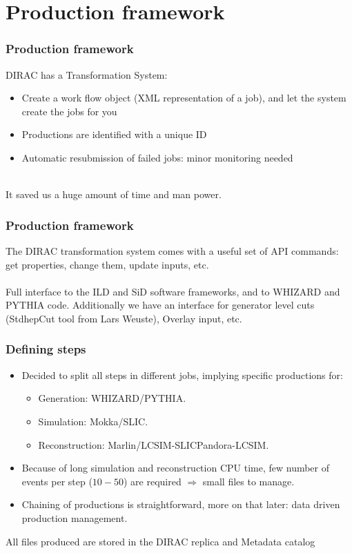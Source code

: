 \documentclass{beamer}
\begin{document}
\section{Production framework}
\begin{frame}
	\frametitle{Production framework}
DIRAC has a Transformation System:
\begin{itemize}
\item  Create a work flow object (XML representation of a job), and let the system create the jobs for you
\item Productions are identified with a unique ID
\item Automatic resubmission of failed jobs: minor monitoring needed
\end{itemize}
~\\
It \alert{saved us a huge amount of time and man power}.
\end{frame}

\begin{frame}
\frametitle{Production framework}
The DIRAC transformation system comes with a useful set of API commands: get properties, change them, update inputs, etc.\\
~\\
\alert{Full interface to the ILD and SiD software frameworks}, and to WHIZARD and PYTHIA code. Additionally we have an interface for generator level cuts (StdhepCut tool from Lars Weuste), Overlay input, etc.~\\

\end{frame}

\begin{frame}
\frametitle{Defining steps}
\begin{itemize}
\item Decided to split all steps in different jobs, implying specific productions for:
\begin{itemize}
\item Generation: WHIZARD/PYTHIA.
\item Simulation: Mokka/SLIC.
\item Reconstruction: Marlin/LCSIM-SLICPandora-LCSIM.
\end{itemize}
\item Because of long simulation and reconstruction CPU time, few number of events per step ($10-50$) are required $\Rightarrow$ small files to manage.
\item Chaining of productions is straightforward, more on that later: \alert{data driven production management}.
\end{itemize}
All files produced are stored in the DIRAC replica and Metadata catalog
\end{frame}
\end{document}
